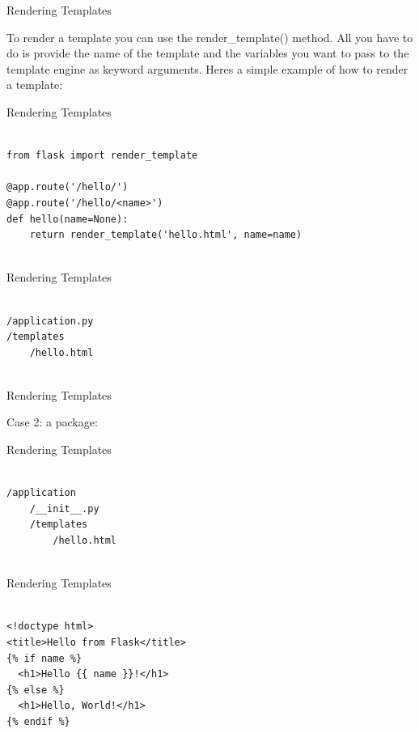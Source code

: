 \documentclass{beamer}
\begin{document}
\begin{frame}[t]{Rendering Templates}

To render a template you can use the render\_template()
method.  All you have to do is provide the name of the template and the
variables you want to pass to the template engine as keyword arguments.
Heres a simple example of how to render a template:

\end{frame}


\begin{frame}[t,fragile]{Rendering Templates}


\begin{verbatim}

from flask import render_template

@app.route('/hello/')
@app.route('/hello/<name>')
def hello(name=None):
    return render_template('hello.html', name=name)


\end{verbatim}


\end{frame}


\begin{frame}[t,fragile]{Rendering Templates}


\begin{verbatim}

/application.py
/templates
    /hello.html


\end{verbatim}


\end{frame}


\begin{frame}[t]{Rendering Templates}

Case 2: a package:

\end{frame}


\begin{frame}[t,fragile]{Rendering Templates}


\begin{verbatim}

/application
    /__init__.py
    /templates
        /hello.html


\end{verbatim}


\end{frame}




\begin{frame}[t,fragile]{Rendering Templates}


\begin{verbatim}

<!doctype html>
<title>Hello from Flask</title>
{% if name %}
  <h1>Hello {{ name }}!</h1>
{% else %}
  <h1>Hello, World!</h1>
{% endif %}


\end{verbatim}


\end{frame}
\end{document}
